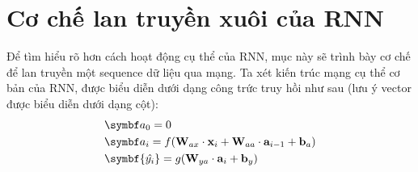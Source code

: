 \section{Cơ chế lan truyền xuôi của RNN}
Để tìm hiểu rõ hơn cách hoạt động cụ thể của RNN, mục này sẽ trình bày cơ chế để lan truyền một sequence dữ liệu qua mạng. Ta xét kiến trúc mạng cụ thể cơ bản của RNN, được biểu diễn dưới dạng công trức truy hồi như sau (lưu ý vector được biểu diễn dưới dạng cột):
\begin{align}
     & \symbf a_0 = 0              \\ \nonumber
     & \symbf a_i = f (\textbf W_{ax}\cdot \textbf x_i + \textbf W_{aa} \cdot \textbf a_{i-1} + \textbf b_a) \\ \nonumber
     & \symbf{\hat{y_i}} = g(\textbf W_{ya} \cdot \textbf a_i + \textbf b_y) \label{rnn_equation}
\end{align}

